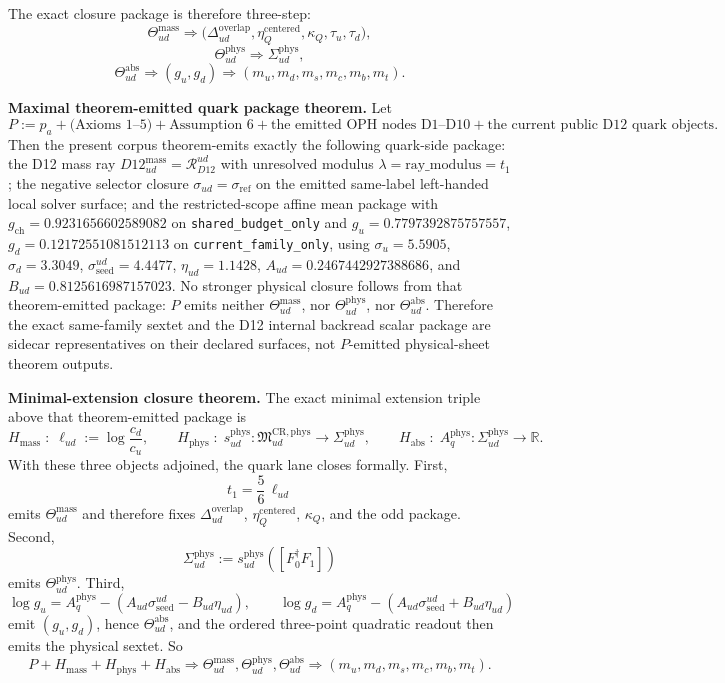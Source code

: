 The exact closure package is therefore three-step:
\[
\Theta_{ud}^{\mathrm{mass}}
\Longrightarrow
\bigl(\Delta_{ud}^{\mathrm{overlap}},\eta_Q^{\mathrm{centered}},\kappa_Q,\tau_u,\tau_d\bigr),
\]
\[
\Theta_{ud}^{\mathrm{phys}}
\Longrightarrow
\Sigma_{ud}^{\mathrm{phys}},
\]
\[
\Theta_{ud}^{\mathrm{abs}}
\Longrightarrow
(g_u,g_d)
\Longrightarrow
(m_u,m_d,m_s,m_c,m_b,m_t).
\]

\textbf{Maximal theorem-emitted quark package theorem.} Let
\[
P:=p_a+\text{(Axioms 1--5)}+\text{Assumption 6}
+\text{the emitted OPH nodes D1--D10}
+\text{the current public D12 quark objects}.
\]
Then the present corpus theorem-emits exactly the following quark-side package: the D12 mass ray \(D12_{ud}^{\mathrm{mass}}=\mathcal R_{D12}^{ud}\) with unresolved modulus \(\lambda=\mathrm{ray\_modulus}=t_1\); the negative selector closure \(\sigma_{ud}=\sigma_{\mathrm{ref}}\) on the emitted same-label left-handed local solver surface; and the restricted-scope affine mean package with \(g_{\mathrm{ch}}=0.9231656602589082\) on \texttt{shared\_budget\_only} and \(g_u=0.7797392875757557\), \(g_d=0.12172551081512113\) on \texttt{current\_family\_only}, using \(\sigma_u=5.5905\), \(\sigma_d=3.3049\), \(\sigma_{\mathrm{seed}}^{ud}=4.4477\), \(\eta_{ud}=1.1428\), \(A_{ud}=0.2467442927388686\), and \(B_{ud}=0.8125616987157023\). No stronger physical closure follows from that theorem-emitted package: \(P\) emits neither \(\Theta_{ud}^{\mathrm{mass}}\), nor \(\Theta_{ud}^{\mathrm{phys}}\), nor \(\Theta_{ud}^{\mathrm{abs}}\). Therefore the exact same-family sextet and the D12 internal backread scalar package are sidecar representatives on their declared surfaces, not \(P\)-emitted physical-sheet theorem outputs.

\textbf{Minimal-extension closure theorem.} The exact minimal extension triple above that theorem-emitted package is
\[
H_{\mathrm{mass}}
\;:\;
\ell_{ud}:=\log\frac{c_d}{c_u},
\qquad
H_{\mathrm{phys}}
\;:\;
s_{ud}^{\mathrm{phys}}:\mathfrak M_{ud}^{\mathrm{CR,phys}}\to\Sigma_{ud}^{\mathrm{phys}},
\qquad
H_{\mathrm{abs}}
\;:\;
A_q^{\mathrm{phys}}:\Sigma_{ud}^{\mathrm{phys}}\to\mathbb R.
\]
With these three objects adjoined, the quark lane closes formally. First,
\[
t_1=\frac56\,\ell_{ud}
\]
emits \(\Theta_{ud}^{\mathrm{mass}}\) and therefore fixes \(\Delta_{ud}^{\mathrm{overlap}}\), \(\eta_Q^{\mathrm{centered}}\), \(\kappa_Q\), and the odd package. Second,
\[
\Sigma_{ud}^{\mathrm{phys}}
:=
s_{ud}^{\mathrm{phys}}([F_0^\dagger F_1])
\]
emits \(\Theta_{ud}^{\mathrm{phys}}\). Third,
\[
\log g_u
=
A_q^{\mathrm{phys}}-(A_{ud}\sigma_{\mathrm{seed}}^{ud}-B_{ud}\eta_{ud}),
\qquad
\log g_d
=
A_q^{\mathrm{phys}}-(A_{ud}\sigma_{\mathrm{seed}}^{ud}+B_{ud}\eta_{ud})
\]
emit \((g_u,g_d)\), hence \(\Theta_{ud}^{\mathrm{abs}}\), and the ordered three-point quadratic readout then emits the physical sextet. So
\[
P+H_{\mathrm{mass}}+H_{\mathrm{phys}}+H_{\mathrm{abs}}
\Longrightarrow
\Theta_{ud}^{\mathrm{mass}},\Theta_{ud}^{\mathrm{phys}},\Theta_{ud}^{\mathrm{abs}}
\Longrightarrow
(m_u,m_d,m_s,m_c,m_b,m_t).
\]


